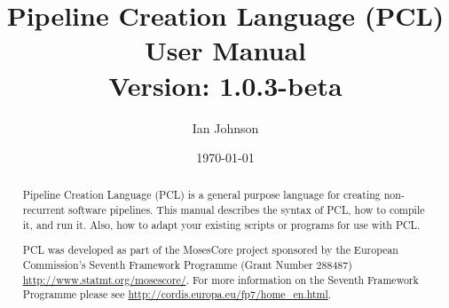\documentclass[11pt,a4paper,openright]{report}
\newcommand{\ReleaseVersion}{1.0.3-beta}
\begin{document}
\title{\huge{Pipeline Creation Language (PCL)}\\
\LARGE{User Manual}\\
\normalsize{Version: \ReleaseVersion}}
\author{Ian Johnson}
\date{\today}

\maketitle

\onehalfspacing

\begin{abstract}
Pipeline Creation Language (PCL) is a general purpose language for creating non-recurrent software pipelines. This manual describes the syntax of PCL, how to compile it, and run it. Also, how to adapt your existing scripts or programs for use with PCL.

PCL was developed as part of the MosesCore project sponsored by the European Commission's Seventh Framework Programme (Grant Number 288487) \url{http://www.statmt.org/mosescore/}. For more information on the Seventh Framework Programme please see \url{http://cordis.europa.eu/fp7/home_en.html}.
\end{abstract}


\tableofcontents
\listoffigures

\cleardoublepage
\setcounter{page}{1}






%
\end{document}
